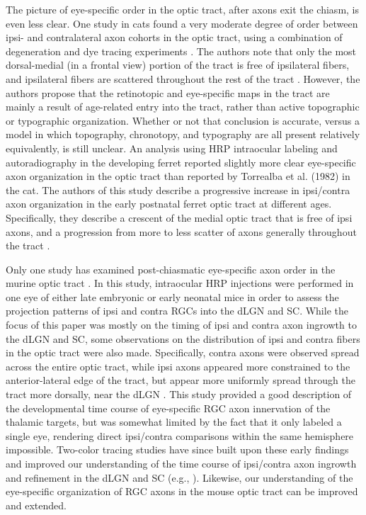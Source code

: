 The picture of eye-specific order in the optic tract, after axons exit the chiasm, is even less clear.
One study in cats found a very moderate degree of order between ipsi- and contralateral axon cohorts in the optic tract, using a combination of degeneration and dye tracing experiments \cite{torrealba1982studies}.
The authors note that only the most dorsal-medial (in a frontal view) portion of the tract is free of ipsilateral fibers, and ipsilateral fibers are scattered throughout the rest of the tract \cite{torrealba1982studies}.
However, the authors propose that the retinotopic and eye-specific maps in the tract are mainly a result of age-related entry into the tract, rather than active topographic or typographic organization.
Whether or not that conclusion is accurate, versus a model in which topography, chronotopy, and typography are all present relatively equivalently, is still unclear.
An analysis using HRP intraocular labeling and autoradiography in the developing ferret reported slightly more clear eye-specific axon organization in the optic tract \cite{linden1981dorsal} than reported by Torrealba et al. (1982) in the cat.
The authors of this study describe a progressive increase in ipsi/contra axon organization in the early postnatal ferret optic tract at different ages.
Specifically, they describe a crescent of the medial optic tract that is free of ipsi axons, and a progression from more to less scatter of axons generally throughout the tract \cite{linden1981dorsal}.

Only one study has examined post-chiasmatic eye-specific axon order in the murine optic tract \cite{godement1984prenatal}.
In this study, intraocular HRP injections were performed in one eye of either late embryonic or early neonatal mice in order to assess the projection patterns of ipsi and contra RGCs into the dLGN and SC.
While the focus of this paper was mostly on the timing of ipsi and contra axon ingrowth to the dLGN and SC, some observations on the distribution of ipsi and contra fibers in the optic tract were also made.
Specifically, contra axons were observed spread across the entire optic tract, while ipsi axons appeared more constrained to the anterior-lateral edge of the tract, but appear more uniformly spread through the tract more dorsally, near the dLGN \cite{godement1984prenatal}.
This study provided a good description of the developmental time course of eye-specific RGC axon innervation of the thalamic targets, but was somewhat limited by the fact that it only labeled a single eye, rendering direct ipsi/contra comparisons within the same hemisphere impossible.
Two-color tracing studies have since built upon these early findings and improved our understanding of the time course of ipsi/contra axon ingrowth and refinement in the dLGN and SC (e.g., \cite{jaubert2005structural}).
Likewise, our understanding of the eye-specific organization of RGC axons in the mouse optic tract can be improved and extended.


